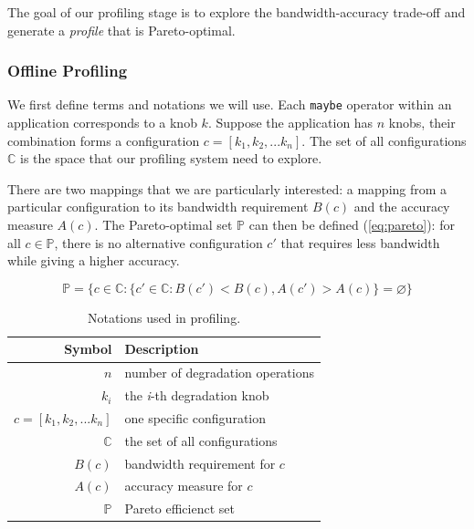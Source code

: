 The goal of our profiling stage is to explore the bandwidth-accuracy trade-off
and generate a \textit{profile} that is Pareto-optimal.

\subsubsection{Offline Profiling}
\label{sec:offline-profiling}

We first define terms and notations we will use. Each \texttt{maybe} operator
within an application corresponds to a knob $k$. Suppose the application has $n$
knobs, their combination forms a configuration $c = [k_{1}, k_{2},
... k_{n}]$. The set of all configurations $\mathbb{C}$ is the space that our
profiling system need to explore.

There are two mappings that we are particularly interested: a mapping from a
particular configuration to its bandwidth requirement $B(c)$ and the accuracy
measure $A(c)$. The Pareto-optimal set $\mathbb{P}$ can then be defined
(\autoref{eq:pareto}): for all $c \in \mathbb{P}$, there is no alternative
configuration $c'$ that requires less bandwidth while giving a higher accuracy.

{\small
\begin{equation}
  \mathbb{P} = \{ c \in \mathbb{C} : \{ c' \in \mathbb{C}: B(c') < B(c),
  A(c') > A(c) \} = \varnothing\}
  \label{eq:pareto}
\end{equation}
}%

\begin{table}
  \centering
  \begin{tabular}{r l}
    \toprule
    \textbf{Symbol} & \textbf{Description} \\
    \midrule
    $n$ & number of degradation operations \\
    $k_i$ & the \textit{i}-th degradation knob \\
    $c = [k_{1}, k_{2}, ... k_{n}]$ & one specific configuration \\
    $\mathbb{C}$ & the set of all configurations \\
    \midrule
    $B(c)$ & bandwidth requirement for $c$ \\
    $A(c)$ & accuracy measure for $c$ \\
    $\mathbb{P}$ & Pareto efficienct set \\
    \bottomrule
  \end{tabular}
  \caption{Notations used in profiling.}
  \label{tab:notations}
\end{table}

